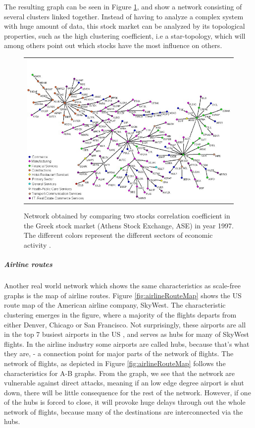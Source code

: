 The resulting graph can be seen in Figure \ref{fig:greekStockMarket}, and show a network consisting of several clusters linked together. Instead of having to analyze a complex system with huge amount of data, this stock market can be analyzed by its topological properties, such as the high clustering coefficient, i.e a star-topology, which will among others point out which stocks have the most influence on others. 
\begin{figure}[h]
\centering
\begin{tabular}{@{}c@{}}
\includegraphics[width=1.0\textwidth]{../Figures/greekStockMarket.jpg}
\end{tabular}
\caption[Caption for LOF]{Network obtained by comparing two stocks correlation coefficient in the Greek stock market (Athens Stock Exchange, ASE) in year 1997. The different colors represent the different sectors of economic activity \cite{greekStockMarket}.
\label{fig:greekStockMarket}}
\end{figure}

\subparagraph{Airline routes}
Another real world network which shows the same characteristics as scale-free graphs is the map of airline routes. Figure \ref{fig:airlineRouteMap} shows the US route map of the American airline company, SkyWest. The characteristic clustering emerges in the figure, where a majority of the flights departs from either Denver, Chicago or San Francisco. Not surprisingly, these airports are all in the top 7 busiest airports in the US \cite{busiestAirports}, and serves as hubs for many of SkyWest flights. In the airline industry some airports are called hubs, because that's what they are, - a connection point for major parts of the network of flights. The network of flights, as depicted in Figure \ref{fig:airlineRouteMap} follows the characteristics for A-B graphs. From the graph, we see that the network are vulnerable against direct attacks, meaning if an low edge degree airport is shut down, there will be little consequence for the rest of the network. However, if one of the hubs is forced to close, it will provoke huge delays through out the whole network of flights, because many of the destinations are interconnected via the hubs. 


